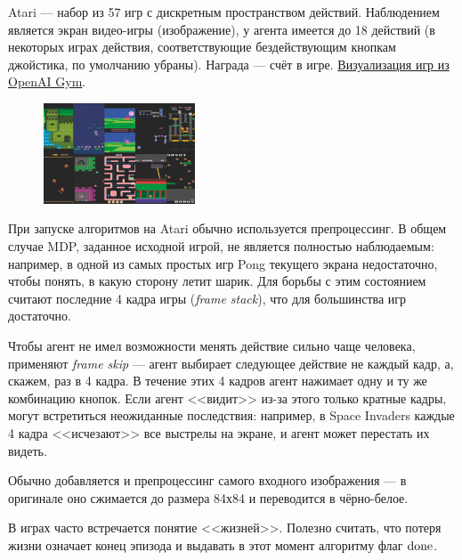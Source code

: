 \begin{example}
Atari --- набор из 57 игр с дискретным пространством действий. Наблюдением является экран видео-игры (изображение), у агента имеется до 18 действий (в некоторых играх действия, соответствующие бездействующим кнопкам джойстика, по умолчанию убраны). Награда --- счёт в игре. \href{https://gym.openai.com/envs/#atari}{Визуализация игр из OpenAI Gym}.

\begin{figure}
\centering
\vspace{-0.3cm}
\includegraphics[width=0.4\textwidth]{Images/Atari.png}
\vspace{-0.8cm}
\end{figure}

При запуске алгоритмов на Atari обычно используется препроцессинг. В общем случае MDP, заданное исходной игрой, не является полностью наблюдаемым: например, в одной из самых простых игр Pong текущего экрана недостаточно, чтобы понять, в какую сторону летит шарик. Для борьбы с этим состоянием считают последние 4 кадра игры (\emph{frame stack}), что для большинства игр достаточно.

Чтобы агент не имел возможности менять действие сильно чаще человека, применяют \emph{frame skip} --- агент выбирает следующее действие не каждый кадр, а, скажем, раз в 4 кадра. В течение этих 4 кадров агент нажимает одну и ту же комбинацию кнопок. Если агент <<видит>> из-за этого только кратные кадры, могут встретиться неожиданные последствия: например, в Space Invaders каждые 4 кадра <<исчезают>> все выстрелы на экране, и агент может перестать их видеть.

\begin{remark}
Обычно добавляется и препроцессинг самого входного изображения --- в оригинале оно сжимается до размера 84х84 и переводится в чёрно-белое.
\end{remark}

\begin{remark}
В играх часто встречается понятие <<жизней>>. Полезно считать, что потеря жизни означает конец эпизода и выдавать в этот момент алгоритму флаг $\mathrm{done}$. 
\end{remark}


\end{example}
